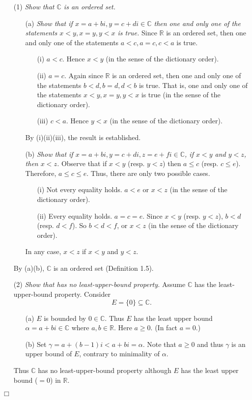 \documentclass{article}
\begin{document}
\begin{enumerate}
\item[(1)]
\emph{Show that $\mathbb{C}$ is an ordered set.}
  \begin{enumerate}
  \item[(a)]
  \emph{Show that if $x = a+bi, y = c+di \in \mathbb{C}$
  then one and only one of the statements
  $x < y, x = y, y < x$ is true.}
  Since $\mathbb{R}$ is an ordered set,
  then one and only one of the statements
  $a < c, a = c, c < a$ is true.
    \begin{enumerate}
    \item[(i)]
    $a < c$. Hence $x < y$ (in the sense of the dictionary order).
    \item[(ii)]
    $a = c$. Again since $\mathbb{R}$ is an ordered set,
    then one and only one of the statements
    $b < d, b = d, d < b$ is true.
    That is, one and only one of the statements
    $x < y, x = y, y < x$ is true (in the sense of the dictionary order).
    \item[(iii)]
    $c < a$. Hence $y < x$ (in the sense of the dictionary order).
    \end{enumerate}
    By (i)(ii)(iii), the result is established.
  \item[(b)]
  \emph{Show that if $x=a+bi, y=c+di, z=e+fi \in \mathbb{C}$,
  if $x < y$ and $y < z$, then $x < z$.}
  Observe that if $x < y$ (resp. $y < z$) then $a \leq c$ (resp. $c \leq e$).
  Therefore, $a \leq c \leq e$. Thus, there are only two possible cases.
    \begin{enumerate}
    \item[(i)]
    Not every equality holds. $a < e$ or $x < z$ (in the sense of the dictionary order).
    \item[(ii)]
    Every equality holds. $a = c = e$.
    Since $x < y$ (resp. $y < z$), $b < d$ (resp. $d < f$).
    So $b < d < f$, or $x < z$ (in the sense of the dictionary order).
    \end{enumerate}
    In any case, $x < z$ if $x < y$ and $y < z$.
  \end{enumerate}
  By (a)(b), $\mathbb{C}$ is an ordered set (Definition 1.5).
\item[(2)]
\emph{Show that has no least-upper-bound property.}
Assume $\mathbb{C}$ has the least-upper-bound property.
Consider $$E = \{ 0 \} \subseteq \mathbb{C}.$$
  \begin{enumerate}
  \item[(a)]
  $E$ is bounded by $0 \in \mathbb{C}$.
  Thus $E$ has the least upper bound $\alpha = a+bi \in \mathbb{C}$
  where $a, b \in \mathbb{R}$. Here $a \geq 0$. (In fact $a = 0$.)
  \item[(b)]
  Set $\gamma = a+(b-1)i < a+bi = \alpha$. Note that $a \geq 0$ and thus
  $\gamma$ is an upper bound of $E$, contrary to minimality of $\alpha$.
  \end{enumerate}
Thus $\mathbb{C}$ has no least-upper-bound property
although $E$ has the least upper bound ($=0$) in $\mathbb{R}$.
\end{enumerate}
$\Box$ \\\\
\end{document}
